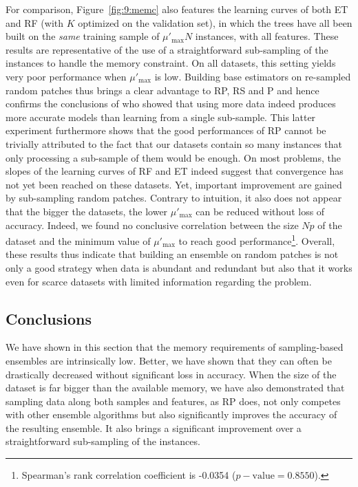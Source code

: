 For comparison, Figure~\ref{fig:9:memc} also features the learning curves of both
ET and RF (with $K$ optimized on the validation set), in which the trees have
all been built on the {\it same} training sample of $\mu'_{\text{max}}N$ instances,
with all features. These results are representative of the use of a
straightforward sub-sampling of the instances to handle the memory constraint.
On all datasets, this setting yields very poor performance when $\mu'_{\text{max}}$ is
low. Building base estimators on re-sampled random patches thus brings a clear advantage to RP, RS and P and hence confirms the conclusions of \citet{basilico:2011} who showed that using more data indeed produces
more accurate models than learning from a single sub-sample.
This
latter experiment furthermore shows that the good performances of RP
cannot be trivially attributed to the fact that our datasets contain so many
instances that only processing a sub-sample of them would be enough. On most
problems, the slopes of the learning curves of RF and ET indeed suggest that
convergence has not yet been reached on these datasets. Yet, important
improvement are gained by sub-sampling random patches.
Contrary to intuition, it
also does not appear that the bigger the datasets, the lower $\mu'_{\text{max}}$ can be
reduced without loss of accuracy. Indeed, we found no conclusive correlation
between the size $Np$ of the dataset and the minimum value of $\mu'_{\text{max}}$ to
reach good performance\footnote{Spearman's rank correlation coefficient is
-0.0354 ($p-\mathrm{value}=0.8550$).}.
Overall, these results thus indicate that
building an ensemble on random patches is not only a good strategy when data is
abundant and redundant but also that it works even for scarce datasets with
limited information regarding the problem.

\subsection{Conclusions}

We have shown in this section that the memory requirements of sampling-based
ensembles are intrinsically low. Better, we have shown that they can often be
drastically decreased without significant loss in accuracy. When the size of the
dataset is far bigger than the available memory, we have also demonstrated that
sampling data along both samples and features, as RP does, not only competes
with other ensemble algorithms but also significantly improves the accuracy of
the resulting ensemble. It also brings a significant improvement over a
straightforward sub-sampling of the instances.

